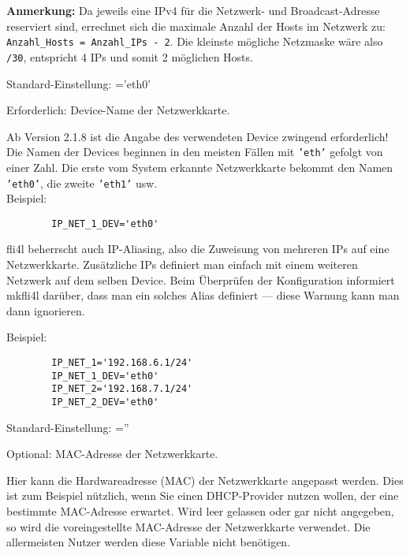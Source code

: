 \begin{description}
{   \textbf{Anmerkung: } Da jeweils eine IPv4 für die Netzwerk- und Broadcast-Adresse
   reserviert sind, errechnet sich die maximale Anzahl der Hosts im Netzwerk
   zu: \texttt{Anzahl\_Hosts = Anzahl\_IPs - 2}. Die kleinste mögliche Netzmaske
   wäre also \texttt{/30}, entspricht 4 IPs und somit 2 möglichen Hosts.
   }


  Standard-Einstellung: ='eth0'
  
  {Erforderlich: Device-Name der Netzwerkkarte.

    Ab Version 2.1.8 ist die Angabe des verwendeten Device zwingend
    erforderlich! Die Namen der Devices beginnen in den meisten Fällen mit 
    \texttt{'eth'} gefolgt von einer Zahl. Die erste vom System erkannte Netzwerkkarte
    bekommt den Namen \texttt{'eth0'}, die zweite \texttt{'eth1'} usw.\\

    Beispiel:

    \begin{example}
    \begin{verbatim}
        IP_NET_1_DEV='eth0'
    \end{verbatim}
    \end{example}

    fli4l beherrscht auch IP-Aliasing, also die Zuweisung von mehreren IPs auf
    eine Netzwerkkarte. Zusätzliche IPs definiert man einfach mit einem weiteren
    Netzwerk auf dem selben Device. Beim Überprüfen der Konfiguration informiert
    mkfli4l darüber, dass man ein solches Alias definiert --- diese Warnung kann
    man dann ignorieren.

    Beispiel:

    \begin{example}
    \begin{verbatim}
        IP_NET_1='192.168.6.1/24'
        IP_NET_1_DEV='eth0'
        IP_NET_2='192.168.7.1/24'
        IP_NET_2_DEV='eth0'
    \end{verbatim}
    \end{example}
    }


  Standard-Einstellung: =''
   
  {Optional: MAC-Adresse der Netzwerkkarte.
    
    Hier kann die Hardwareadresse (MAC) der Netzwerkkarte angepasst werden.
    Dies ist zum Beispiel nützlich, wenn Sie einen DHCP-Provider nutzen wollen,
    der eine bestimmte MAC-Adresse erwartet.
    Wird  leer gelassen oder gar nicht angegeben, so wird
    die voreingestellte MAC-Adresse der Netzwerkkarte verwendet.
    Die allermeisten Nutzer werden diese Variable nicht benötigen.

}
\end{description}
